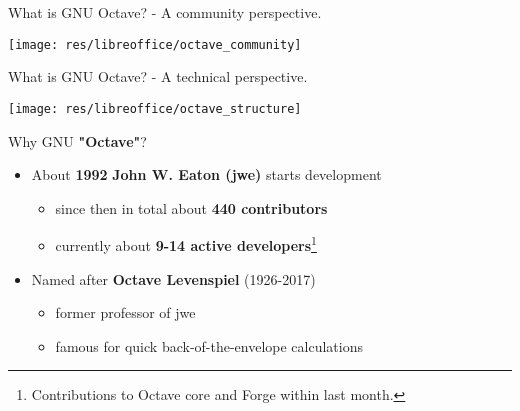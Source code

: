 \begin{frame}{What is GNU Octave? - A community perspective.}
\begin{center}
\texttt{[image: res/libreoffice/octave\_community]}
\end{center}
\end{frame}



\begin{frame}{What is GNU Octave? - A technical perspective.}
\vspace*{-1em}
\begin{center}
\texttt{[image: res/libreoffice/octave\_structure]}
\end{center}
\end{frame}



\begin{frame}{Why GNU \textbf{"Octave"}?}

\begin{itemize}
\itemsep2em
\item
About \textbf{1992} \textbf{\color{DarkBlue}John W. Eaton (jwe)}
starts development\\[0.5em]
\begin{itemize}
\itemsep1em
\item
since then in total about \textbf{440 contributors}
\item
currently about \textbf{9-14 active developers}\footnote{Contributions to Octave core and Forge within last month.}
\end{itemize}

\item
Named after \textbf{\color{DarkBlue}Octave Levenspiel} (1926-2017)\\[0.5em]
\begin{itemize}
\itemsep1em
\item
former professor of jwe
\item
famous for quick back-of-the-envelope calculations
\end{itemize}
\end{itemize}
\end{frame}


